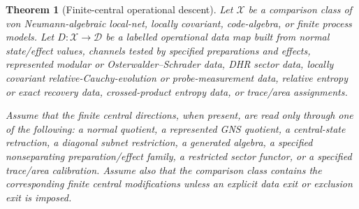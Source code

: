 \documentclass[12pt]{article}
\newtheorem{theorem}{Theorem}
\theoremstyle{definition}
\theoremstyle{remark}
\newcommand{\D}{\mathcal D}
\begin{document}
\begin{theorem}[Finite-central operational descent]
\label{thm:main}
Let \(\mathcal X\) be a comparison class of von Neumann-algebraic local-net,
locally covariant, code-algebra, or finite process models.  Let
\(D:\mathcal X\to\D\) be a labelled operational data map built from normal
state/effect values, channels tested by specified preparations and effects,
represented modular or Osterwalder--Schrader data, DHR sector data, locally
covariant relative-Cauchy-evolution or probe-measurement data, relative entropy
or exact recovery data, crossed-product entropy data, or trace/area
assignments.

Assume that the finite central directions, when present, are read only through
one of the following: a normal quotient, a represented GNS quotient, a
central-state retraction, a diagonal subnet restriction, a generated algebra,
a specified nonseparating preparation/effect family, a restricted sector
functor, or a specified trace/area calibration.  Assume also that the
comparison class contains the corresponding finite central modifications unless
an explicit data exit or exclusion exit is imposed.


\end{theorem}
\end{document}

